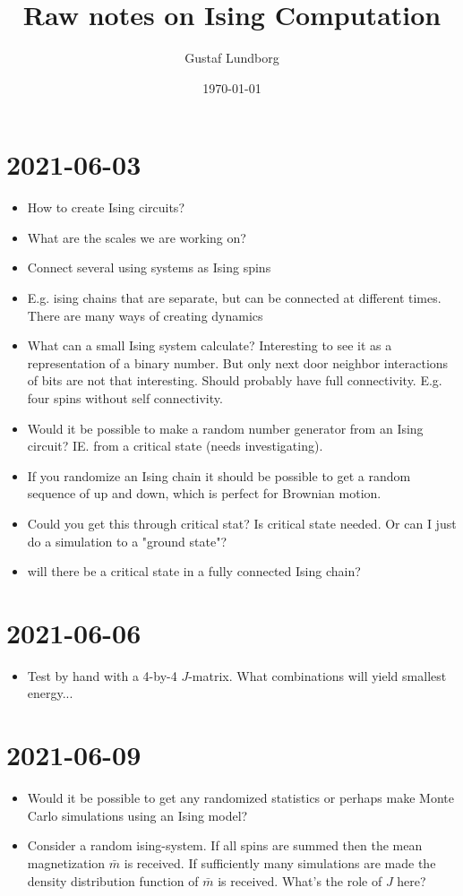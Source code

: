 \documentclass[11pt]{article}
\title{Raw notes on Ising Computation}
\author{Gustaf Lundborg}
\date{\today}
\begin{document}
\maketitle
\pagebreak



\section{2021-06-03}
\begin{itemize}
\item How to create Ising circuits?
\item What are the scales we are working on?
\item Connect several using systems as Ising spins
\item E.g. ising chains that are separate, but can be connected at different times. There are many ways of creating dynamics
\item What can a small Ising system calculate? Interesting to see it as a representation of a binary number. But only next door neighbor interactions of bits are not that interesting. Should probably have full connectivity. E.g. four spins without self connectivity.
\item Would it be possible to make a random number generator from an Ising circuit? IE. from a critical state (needs investigating).
\item If you randomize an Ising chain it should be possible to get a random sequence of up and down, which is perfect for Brownian motion.
\item Could you get this through critical stat? Is critical state needed. Or can I just do a simulation to a "ground state"?
\item will there be a critical state in a fully connected Ising chain?
\end{itemize}

\section{2021-06-06}
\begin{itemize}
\item Test by hand with a 4-by-4 \(J\)-matrix. What combinations will yield smallest energy...
\end{itemize}

\section{2021-06-09}
\begin{itemize}
\item Would it be possible to get any randomized statistics or perhaps make Monte Carlo simulations using an Ising model?
\item Consider a random ising-system. If all spins are summed then the mean magnetization \(\bar{m}\) is received. If sufficiently many simulations are made the density distribution function of \(\bar{m}\) is received. What's the role of \(J\) here?
\end{itemize}


\end{document}
